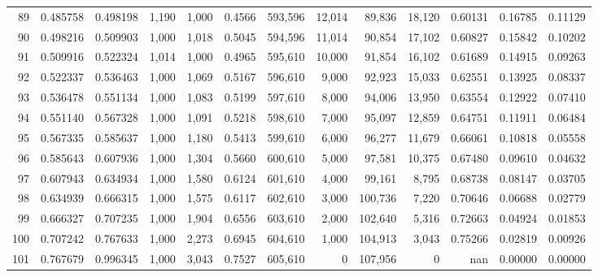 \begin{tabular}{rrrrrrrrrrrrr}
89  &  0.485758 &  0.498198 &   1,190 &  1,000 &                                     0.4566 &  593,596 &   12,014 &   89,836 &   18,120 &  0.60131 &  0.16785 &  0.11129 \\
90  &  0.498216 &  0.509903 &   1,000 &  1,018 &                                     0.5045 &  594,596 &   11,014 &   90,854 &   17,102 &  0.60827 &  0.15842 &  0.10202 \\
91  &  0.509916 &  0.522324 &   1,014 &  1,000 &                                     0.4965 &  595,610 &   10,000 &   91,854 &   16,102 &  0.61689 &  0.14915 &  0.09263 \\
92  &  0.522337 &  0.536463 &   1,000 &  1,069 &                                     0.5167 &  596,610 &    9,000 &   92,923 &   15,033 &  0.62551 &  0.13925 &  0.08337 \\
93  &  0.536478 &  0.551134 &   1,000 &  1,083 &                                     0.5199 &  597,610 &    8,000 &   94,006 &   13,950 &  0.63554 &  0.12922 &  0.07410 \\
94  &  0.551140 &  0.567328 &   1,000 &  1,091 &                                     0.5218 &  598,610 &    7,000 &   95,097 &   12,859 &  0.64751 &  0.11911 &  0.06484 \\
95  &  0.567335 &  0.585637 &   1,000 &  1,180 &                                     0.5413 &  599,610 &    6,000 &   96,277 &   11,679 &  0.66061 &  0.10818 &  0.05558 \\
96  &  0.585643 &  0.607936 &   1,000 &  1,304 &                                     0.5660 &  600,610 &    5,000 &   97,581 &   10,375 &  0.67480 &  0.09610 &  0.04632 \\
97  &  0.607943 &  0.634934 &   1,000 &  1,580 &                                     0.6124 &  601,610 &    4,000 &   99,161 &    8,795 &  0.68738 &  0.08147 &  0.03705 \\
98  &  0.634939 &  0.666315 &   1,000 &  1,575 &                                     0.6117 &  602,610 &    3,000 &  100,736 &    7,220 &  0.70646 &  0.06688 &  0.02779 \\
99  &  0.666327 &  0.707235 &   1,000 &  1,904 &                                     0.6556 &  603,610 &    2,000 &  102,640 &    5,316 &  0.72663 &  0.04924 &  0.01853 \\
100 &  0.707242 &  0.767633 &   1,000 &  2,273 &                                     0.6945 &  604,610 &    1,000 &  104,913 &    3,043 &  0.75266 &  0.02819 &  0.00926 \\
101 &  0.767679 &  0.996345 &   1,000 &  3,043 &                                     0.7527 &  605,610 &        0 &  107,956 &        0 &      nan &  0.00000 &  0.00000 \\
\bottomrule
\end{tabular}
